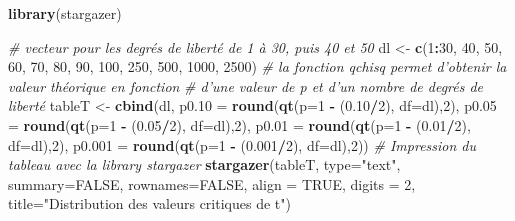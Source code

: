 \documentclass[
  11pt,
  french,
]{book}
\makeatletter
\newenvironment{Shaded}{\begin{snugshade}}{\end{snugshade}}
\newcommand{\CommentTok}[1]{\textcolor[rgb]{0.56,0.35,0.01}{\textit{#1}}}
\newcommand{\DataTypeTok}[1]{\textcolor[rgb]{0.13,0.29,0.53}{#1}}
\newcommand{\DecValTok}[1]{\textcolor[rgb]{0.00,0.00,0.81}{#1}}
\newcommand{\FloatTok}[1]{\textcolor[rgb]{0.00,0.00,0.81}{#1}}
\newcommand{\KeywordTok}[1]{\textcolor[rgb]{0.13,0.29,0.53}{\textbf{#1}}}
\newcommand{\NormalTok}[1]{#1}
\newcommand{\OperatorTok}[1]{\textcolor[rgb]{0.81,0.36,0.00}{\textbf{#1}}}
\newcommand{\OtherTok}[1]{\textcolor[rgb]{0.56,0.35,0.01}{#1}}
\newcommand{\StringTok}[1]{\textcolor[rgb]{0.31,0.60,0.02}{#1}}
\newenvironment{kframe}{%
\medskip{}
\setlength{\fboxsep}{.8em}
 \def\at@end@of@kframe{}%
 \ifinner\ifhmode%
  \def\at@end@of@kframe{\end{minipage}}%
  \begin{minipage}{\columnwidth}%
 \fi\fi%
 \def\FrameCommand##1{\hskip\@totalleftmargin \hskip-\fboxsep
 \colorbox{shadecolor}{##1}\hskip-\fboxsep
     \hskip-\linewidth \hskip-\@totalleftmargin \hskip\columnwidth}%
 \MakeFramed {\advance\hsize-\width
   \@totalleftmargin\z@ \linewidth\hsize
   \@setminipage}}%
 {\par\unskip\endMakeFramed%
 \at@end@of@kframe}
\renewenvironment{Shaded}{\begin{kframe}}{\end{kframe}}
\makeatother
\begin{document}
\begin{Shaded}
\begin{Highlighting}[]
\KeywordTok{library}\NormalTok{(stargazer)}

\CommentTok{# vecteur pour les degrés de liberté de 1 à 30, puis 40 et 50}
\NormalTok{dl <-}\StringTok{ }\KeywordTok{c}\NormalTok{(}\DecValTok{1}\OperatorTok{:}\DecValTok{30}\NormalTok{, }\DecValTok{40}\NormalTok{, }\DecValTok{50}\NormalTok{, }\DecValTok{60}\NormalTok{, }\DecValTok{70}\NormalTok{, }\DecValTok{80}\NormalTok{, }\DecValTok{90}\NormalTok{, }\DecValTok{100}\NormalTok{, }\DecValTok{250}\NormalTok{, }\DecValTok{500}\NormalTok{, }\DecValTok{1000}\NormalTok{, }\DecValTok{2500}\NormalTok{) }
\CommentTok{# la fonction qchisq permet d'obtenir la valeur théorique en fonction }
\CommentTok{# d'une valeur de p et d'un nombre de degrés de liberté}
\NormalTok{tableT <-}\StringTok{ }\KeywordTok{cbind}\NormalTok{(dl,}
                \DataTypeTok{p0.10 =}  \KeywordTok{round}\NormalTok{(}\KeywordTok{qt}\NormalTok{(}\DataTypeTok{p=}\DecValTok{1} \OperatorTok{-}\StringTok{ }\NormalTok{(}\FloatTok{0.10}\OperatorTok{/}\DecValTok{2}\NormalTok{),  }\DataTypeTok{df=}\NormalTok{dl),}\DecValTok{2}\NormalTok{),}
                \DataTypeTok{p0.05 =}  \KeywordTok{round}\NormalTok{(}\KeywordTok{qt}\NormalTok{(}\DataTypeTok{p=}\DecValTok{1} \OperatorTok{-}\StringTok{ }\NormalTok{(}\FloatTok{0.05}\OperatorTok{/}\DecValTok{2}\NormalTok{),  }\DataTypeTok{df=}\NormalTok{dl),}\DecValTok{2}\NormalTok{),}
                \DataTypeTok{p0.01 =}  \KeywordTok{round}\NormalTok{(}\KeywordTok{qt}\NormalTok{(}\DataTypeTok{p=}\DecValTok{1} \OperatorTok{-}\StringTok{ }\NormalTok{(}\FloatTok{0.01}\OperatorTok{/}\DecValTok{2}\NormalTok{),  }\DataTypeTok{df=}\NormalTok{dl),}\DecValTok{2}\NormalTok{),}
                \DataTypeTok{p0.001 =} \KeywordTok{round}\NormalTok{(}\KeywordTok{qt}\NormalTok{(}\DataTypeTok{p=}\DecValTok{1} \OperatorTok{-}\StringTok{ }\NormalTok{(}\FloatTok{0.001}\OperatorTok{/}\DecValTok{2}\NormalTok{), }\DataTypeTok{df=}\NormalTok{dl),}\DecValTok{2}\NormalTok{))}
\CommentTok{# Impression du tableau avec la library stargazer}
\KeywordTok{stargazer}\NormalTok{(tableT, }\DataTypeTok{type=}\StringTok{"text"}\NormalTok{, }\DataTypeTok{summary=}\OtherTok{FALSE}\NormalTok{, }\DataTypeTok{rownames=}\OtherTok{FALSE}\NormalTok{, }\DataTypeTok{align =} \OtherTok{TRUE}\NormalTok{, }\DataTypeTok{digits =} \DecValTok{2}\NormalTok{,}
          \DataTypeTok{title=}\StringTok{"Distribution des valeurs critiques de t"}\NormalTok{)}
\end{Highlighting}
\end{Shaded}
\end{document}

